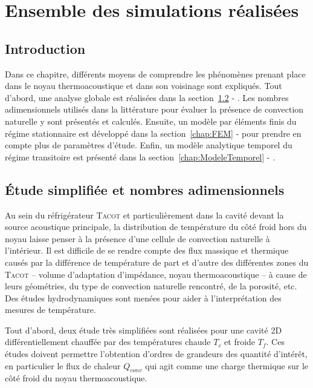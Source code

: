\chapter{Ensemble des simulations réalisées}\label{chap:SimusRealisees}
\mylocaltoc

\section{Introduction}
Dans ce chapitre, différents moyens de comprendre les phénomènes prenant place dans le noyau thermoacoustique et dans son voisinage sont expliqués. Tout d'abord, une analyse globale est réalisées dans la section~\ref{chap:NbrAdim} - . Les nombres adimensionnels utilisés dans la littérature pour évaluer la présence de convection naturelle y sont présentés et calculés. Ensuite, un modèle par éléments finis du régime stationnaire est développé dans la section~\ref{chap:FEM} -  pour prendre en compte plus de paramètres d'étude. Enfin, un modèle analytique temporel du régime transitoire est présenté dans la section~\ref{chap:ModeleTemporel} - .

\section{\'Etude simplifiée et nombres adimensionnels}\label{chap:NbrAdim}
Au sein du réfrigérateur \textsc{Tacot} et particulièrement dans la cavité devant la source acoustique principale, la distribution de température du côté froid hors du noyau laisse penser à la présence d'une cellule de convection naturelle à l'intérieur. Il est difficile de se rendre compte des flux massique et thermique causés par la différence de température de part et d'autre des différentes zones du \textsc{Tacot} -- volume d'adaptation d'impédance, noyau thermoacoustique -- à cause de leurs géométries, du type de convection naturelle rencontré, de la porosité, etc. Des études hydrodynamiques sont menées pour aider à l'interprétation des mesures de température. \medskip

Tout d'abord, deux étude très simplifiées sont réalisées pour une cavité 2D différentiellement chauffée par des températures chaude $T_c$ et froide $T_f$. Ces études doivent permettre l'obtention d'ordres de grandeurs des quantité d'intérêt, en particulier le flux de chaleur $Q_{conv}$ qui agit comme une charge thermique sur le côté froid du noyau thermoacoustique. \smallskip

